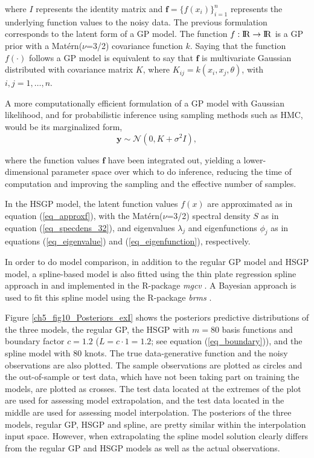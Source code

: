 \documentclass[onecolumn,a4paper,11pt]{article}
\begin{document}
\noindent where $I$ represents the identity matrix and $\bm{f}=\{f(x_i)\}_{i=1}^n$ represents the underlying function values to the noisy data. The previous formulation corresponds to the latent form of a GP model. The function $f:{\rm I\!R} \to {\rm I\!R}$ is a GP prior with a Mat{\'e}rn($\nu$=3/2) covariance function $k$. Saying that the function $f(\cdot)$ follows a GP model is equivalent to say that $\bm{f}$ is multivariate Gaussian distributed with covariance matrix $K$, where $K_{ij}=k(x_i,x_j,\theta)$, with $i,j=1,\dots,n$.
 
A more computationally efficient formulation of a GP model with Gaussian likelihood, and for probabilistic inference using sampling methods such as HMC, would be its marginalized form,
%
\begin{equation*}\label{ch5_eq_marginalizedgp_simudata1}
\bm{y} \sim \mathcal{N}(0, K + \sigma^2 I ),
\end{equation*}

\noindent where the function values $\bm{f}$ have been integrated out, yielding a lower-dimensional parameter space over which to do inference, reducing the time of computation and improving the sampling and the effective number of samples.

In the HSGP model, the latent function values $f(x)$ are approximated as in equation (\ref{eq_approxf}), with the Mat{\'e}rn($\nu$=3/2) spectral density $S$ as in equation (\ref{eq_specdens_32}), and eigenvalues $\lambda_j$ and eigenfunctions $\phi_j$ as in equations (\ref{eq_eigenvalue}) and (\ref{eq_eigenfunction}), respectively. 

In order to do model comparison, in addition to the regular GP model and HSGP model, a spline-based model is also fitted using the thin plate regression spline approach in \cite{wood2003thin} and implemented in the R-package \textit{mgcv} \citep{wood2015package}. A Bayesian approach is used to fit this spline model using the R-package \textit{brms} \citep{burkner2017brms}.

Figure \ref{ch5_fig10_Posteriors_exI} shows the posteriors predictive distributions of the three models, the regular GP, the HSGP with $m=80$ basis functions and boundary factor $c=1.2$ ($L=c\cdot 1= 1.2$; see equation (\ref{eq_boundary})), and the spline model with 80 knots. The true data-generative function and the noisy observations are also plotted. The sample observations are plotted as circles and the out-of-sample or test data, which have not been taking part on training the models, are plotted as crosses. The test data located at the extremes of the plot are used for assessing model extrapolation, and the test data located in the middle are used for assessing model interpolation. The posteriors of the three models, regular GP, HSGP and spline, are pretty similar within the interpolation input space. However, when extrapolating the spline model solution clearly differs from the regular GP and HSGP models as well as the actual observations. 
\end{document}
